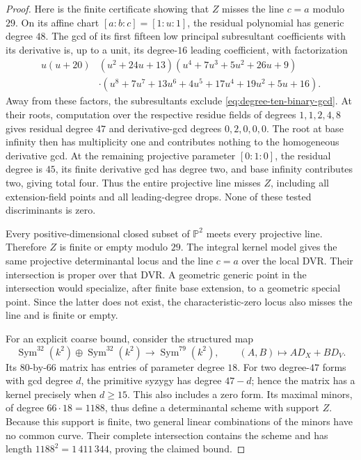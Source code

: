 \begin{proof}
Here is the finite certificate showing that $Z$ misses the line $c=a$
modulo $29$.  On its affine chart $[a:b:c]=[1:u:1]$, the residual
polynomial has generic degree $48$.  The gcd of its first fifteen low
principal subresultant coefficients with its derivative is, up to a
unit, its degree-$16$ leading coefficient, with factorization
\begin{align*}
 u(u+20)&(u^2+24u+13)
 (u^4+7u^3+5u^2+26u+9)\\
 &\cdot(u^8+7u^7+13u^6+4u^5+17u^4+19u^2+5u+16).
\end{align*}
Away from these factors, the subresultants exclude
\eqref{eq:degree-ten-binary-gcd}.  At their roots, computation over the
respective residue fields of degrees $1,1,2,4,8$ gives residual degree
$47$ and derivative-gcd degrees $0,2,0,0,0$.
The root at base infinity then has multiplicity one and contributes
nothing to the homogeneous derivative gcd.
At the remaining projective parameter $[0:1:0]$, the residual degree is
$45$, its finite derivative gcd has degree two, and base infinity
contributes two, giving total four.  Thus the entire projective line
misses $Z$, including all extension-field points and all leading-degree
drops.  None of these tested discriminants is zero.

Every positive-dimensional closed subset of $\mathbb P^2$ meets every
projective line.  Therefore $Z$ is finite or empty modulo $29$.
The integral kernel model gives the same projective determinantal
locus and the line $c=a$ over the local DVR.  Their intersection is
proper over that DVR.  A geometric generic point in the intersection
would specialize, after finite base extension, to a geometric special
point.  Since the latter does not exist, the characteristic-zero locus
also misses the line and is finite or empty.

For an explicit coarse bound, consider the structured map
\[
 \operatorname{Sym}^{32}(k^2)\oplus\operatorname{Sym}^{32}(k^2)
 \longrightarrow\operatorname{Sym}^{79}(k^2),
 \qquad (A,B)\longmapsto A D_X+B D_V.
\]
Its $80$-by-$66$ matrix has entries of parameter degree $18$.
For two degree-$47$ forms with gcd degree $d$, the primitive syzygy has
degree $47-d$; hence the matrix has a kernel precisely when $d\ge15$.
This also includes a zero form.  Its maximal minors, of degree
$66\cdot18=1188$, thus define a determinantal scheme with support $Z$.
Because this support is finite, two general linear combinations of the
minors have no common curve.  Their complete intersection contains the
scheme and has length $1188^2=1\,411\,344$, proving the claimed bound.
\end{proof}

